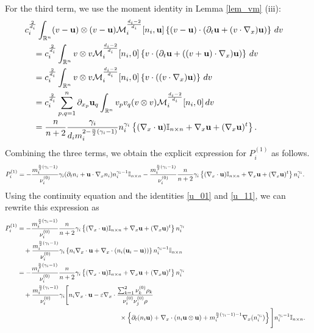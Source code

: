 \documentclass[10pt,reqno]{amsart}
\numberwithin{equation}{section}
\newcommand{\R}{\mathbb R}
\newcommand{\lt}{\left}
\newcommand{\rt}{\right}
\newcommand{\pa}{\partial}
\newcommand{\intr}{\int_{\R^n}}
\begin{document}
For the third term, we use the moment identity in Lemma \ref{lem_vm} (iii):
\begin{align*}
&c_i^{\frac 2{d_i}}\intr (v-{\bf{u}})\otimes (v-{\bf{u}})\mathcal{M}_i^{\frac{d_i-2}{d_i}}[n_i, {\bf{u}}]    \lt\{ (v-{\bf{u}})\cdot \left(\pa_t {\bf{u}}+ (v \cdot \nabla_x) {\bf{u}}\right)\rt\}\,dv\cr 
&\quad =c_i^{\frac 2{d_i}}\intr v\otimes v \mathcal{M}_i^{\frac{d_i-2}{d_i}}[n_i, 0]  \lt\{ v \cdot \left(\pa_t {\bf{u}}+ ( (v+{\bf{u}}) \cdot \nabla_x) {\bf{u}}\right)\rt\}\,dv\cr 
&\quad =c_i^{\frac 2{d_i}}\intr v\otimes v \mathcal{M}_i^{\frac{d_i-2}{d_i}}[n_i, 0]  \lt\{ v \cdot \left(  ( v \cdot \nabla_x) {\bf{u}}\right)\rt\}\,dv\cr 
&\quad = c_i^{\frac{2}{d_i}} \sum_{p,q=1}^n \pa_{x_p} {\bf{u}}_q \int_{\R^n} v_p  v_q  (v \otimes v) \mathcal{M}_i^{\frac{d_i - 2}{d_i}}[n_i, 0]  \, dv \cr
&\quad =\frac{n}{n+2}\frac{\gamma_i}{d_i m_i^{2 - \frac n2(\gamma_i-1)}}n_i^{\gamma_i}\left\{(\nabla_x\cdot {\bf{u}}) \mathbb{I}_{n\times n} +\nabla_x {\bf{u}}+(\nabla_x{\bf{u}})^t \right\}.
\end{align*}
Combining the three terms, we obtain the explicit expression for $P_i^{(1)}$ as follows.
\begin{align*}
P_i^{(1)}&=- \frac{m_i^{\frac n2(\gamma_i - 1)}  }{\nu_i^{(0)}} \gamma_i(\pa_tn_i+{\bf{u}}\cdot\nabla_xn_i)n_i^{\gamma_i-1} \mathbb{I}_{n\times n} -\frac{m_i^{\frac n2(\gamma_i - 1)}}{\nu_i^{(0)}}\frac{n}{n+2} \gamma_i\left\{(\nabla_x\cdot {\bf{u}}) \mathbb{I}_{n\times n} +\nabla_x {\bf{u}}+(\nabla_x{\bf{u}})^t \right\}n_i^{\gamma_i}.  
\end{align*}
Using the continuity equation and the identities \eqref{u_01} and \eqref{u_11}, we can rewrite this expression as
\begin{align*}
P_i^{(1)}&=- \frac{m_i^{\frac n2(\gamma_i - 1)}  }{\nu_i^{(0)}}  \frac{n}{n+2}\gamma_i\left\{ (\nabla_x\cdot {\bf{u}}) \mathbb{I}_{n\times n} +\nabla_x {\bf{u}}+(\nabla_x{\bf{u}})^t\right\}n_i^{\gamma_i} \cr
&\quad +  \frac{m_i^{\frac n2(\gamma_i - 1)}  }{\nu_i^{(0)}} \gamma_i \left\{ n_i\nabla_x\cdot {\bf{u}} +\nabla_x\cdot (n_i({\bf{u}}_i-{\bf{u}}))\right\}n_i^{\gamma_i-1}\mathbb{I}_{n\times n}\cr 
&=-\frac{m_i^{\frac n2(\gamma_i - 1)}  }{\nu_i^{(0)}}  \frac{n}{n+2}\gamma_i\left\{ (\nabla_x\cdot {\bf{u}}) \mathbb{I}_{n\times n} +\nabla_x {\bf{u}}+(\nabla_x{\bf{u}})^t\right\}n_i^{\gamma_i} \cr 
&\quad +\frac{m_i^{\frac n2(\gamma_i - 1)}  }{\nu_i^{(0)}}  \gamma_i \Bigg[ n_i\nabla_x\cdot {\bf{u}} -\varepsilon\nabla_x\cdot \frac{\sum_{k=1}^2\nu_k^{(0)}\rho_k}{\nu_{i}^{(0)}\nu_{j}^{(0)}\rho } \cr
&\hspace{5.5cm} \times \left\{     \pa_t(n_i {\bf{u}}) +\nabla_x\cdot (n_i {\bf{u}}\otimes {\bf{u}}) + m_i^{\frac n2(\gamma_i - 1)-1}\nabla_x (n_i^{\gamma_i}) \right\}\Bigg]n_i^{\gamma_i-1} \mathbb{I}_{n\times n} .
\end{align*} 
\end{document}

